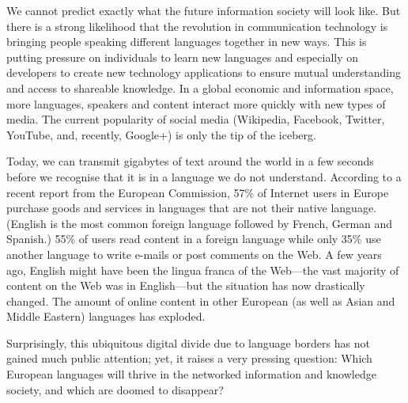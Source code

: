 \documentclass[]{../../metanetpaper}
\begin{document}
\begin{Parallel}[c]{77mm}{77mm}
{We cannot predict exactly what the future information society will
look like.  But there is a strong likelihood that the revolution in
communication technology is bringing people speaking different
languages together in new ways. This is putting pressure on
individuals to learn new languages and especially on developers to
create new technology applications to ensure mutual understanding and
access to shareable knowledge. In a global economic and information
space, more languages, speakers and content interact more quickly with
new types of media. The current popularity of social media (Wikipedia,
Facebook, Twitter, YouTube, and, recently, Google+) is only the tip of
the iceberg.

Today, we can transmit gigabytes of text around the world in a few
seconds before we recognise that it is in a language we do not
understand. According to a recent report from the European Commission,
57\% of Internet users in Europe purchase goods and services in
languages that are not their native language.  (English is the most
common foreign language followed by French, German and Spanish.) 55\%
of users read content in a foreign language while only 35\% use
another language to write e-mails or post comments on the
Web. \cite{EC-prefer} A few years ago, English might have been the
lingua franca of the Web—the vast majority of content on the Web was
in English—but the situation has now drastically changed. The amount
of online content in other European (as well as Asian and Middle
Eastern) languages has exploded.

Surprisingly, this ubiquitous digital divide due to language borders
has not gained much public attention; yet, it raises a very pressing
question: Which European languages will thrive in the networked
information and knowledge society, and which are doomed to disappear?
}

\ParallelPar


\end{Parallel}
\end{document}
